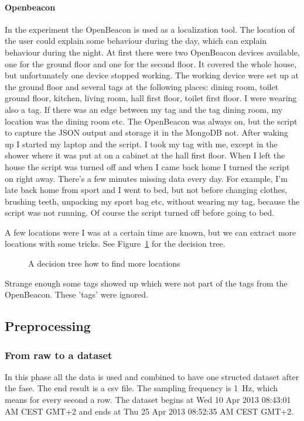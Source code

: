 		\paragraph{Openbeacon}
			In the experiment the OpenBeacon is used as a localization tool. The location of the user could explain some behaviour during the day, which can explain behaviour during the night. At first there were two OpenBeacon devices available, one for the ground floor and one for the second floor. It covered the whole house, but unfortunately one device stopped working. The working device were set up at the ground floor and several tags at the following places: dining room, toilet ground floor, kitchen, living room, hall first floor, toilet first floor. I were wearing also a tag. If there was an edge between my tag and the tag dining room, my location was the dining room etc. The OpenBeacon was always on, but the script to capture the JSON output and storage it in the MongoDB not. After waking up I started my laptop and the script. I took my tag with me, except in the shower where it was put at on a cabinet at the hall first floor. When I left the house the script was turned off and when I came back home I turned the script on right away. There's a few minutes missing data every day. For example, I'm late back home from sport and I went to bed, but not before changing clothes, brushing teeth, unpacking my sport bag etc, without wearing my tag, because the script was not running. Of course the script turned off before going to bed.

			
			A few locations were I was at a certain time are known, but we can extract more locations with some tricks. See Figure~\ref{fig:decisiontree} for the decision tree.

				\begin{figure}[h!]
					
					\caption{A decision tree how to find more locations}
					\label{fig:decisiontree}
				\end{figure}

				Strange enough some tags showed up which were not part of the tags from the OpenBeacon. These 'tags' were ignored.
				
	\subsection{Preprocessing}
		\subsubsection{From raw to a dataset}
			In this phase all the data is used and combined to have one structed dataset after the fase. The end result is a csv file. The sampling frequency is \SI{1}{\hertz}, which means for every second a row. The dataset begins at Wed 10 Apr 2013 08:43:01 AM CEST GMT+2 and ends at Thu 25 Apr 2013 08:52:35 AM CEST GMT+2. 
			
